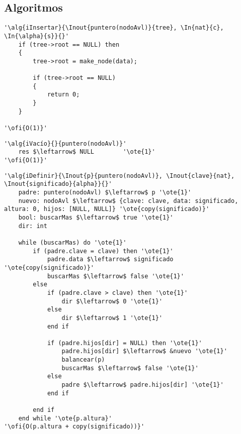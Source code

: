 


\subsection{Algoritmos}

\lstset{style=alg,columns=fixed,basewidth=.5em}

\begin{lstlisting}[mathescape]
'\alg{iInsertar}{\Inout{puntero(nodoAvl)}{tree}, \In{nat}{c}, \In{\alpha}{s}}{}'
    if (tree->root == NULL) then
    {
        tree->root = make_node(data);

        if (tree->root == NULL)
        {
            return 0;
        }
    }
 
'\ofi{O(1)}'
\end{lstlisting}


\lstset{style=alg,columns=fixed,basewidth=.5em}

\begin{lstlisting}[mathescape]
'\alg{iVacío}{}{puntero(nodoAvl)}'
	res $\leftarrow$ NULL		 '\ote{1}'
'\ofi{O(1)}'
\end{lstlisting}

\begin{lstlisting}[mathescape]
'\alg{iDefinir}{\Inout{p}{puntero(nodoAvl)}, \Inout{clave}{nat}, \Inout{significado}{alpha}}{}'
	padre: puntero(nodoAvl) $\leftarrow$ p '\ote{1}'
	nuevo: nodoAvl $\leftarrow$ {clave: clave, data: significado, altura: 0, hijos: [NULL, NULL]} '\ote{copy(significado)}'
	bool: buscarMas $\leftarrow$ true '\ote{1}'
	dir: int

	while (buscarMas) do '\ote{1}'
		if (padre.clave = clave) then '\ote{1}'
			padre.data $\leftarrow$ significado '\ote{copy(significado)}'
			buscarMas $\leftarrow$ false '\ote{1}'
		else
			if (padre.clave > clave) then '\ote{1}'
				dir $\leftarrow$ 0 '\ote{1}'
			else
				dir $\leftarrow$ 1 '\ote{1}'
			end if

		    if (padre.hijos[dir] = NULL) then '\ote{1}'
				padre.hijos[dir] $\leftarrow$ &nuevo '\ote{1}'
				balancear(p)
				buscarMas $\leftarrow$ false '\ote{1}'
			else
				padre $\leftarrow$ padre.hijos[dir] '\ote{1}'
			end if

		end if
	end while '\ote{p.altura}'
'\ofi{O(p.altura + copy(significado))}'
\end{lstlisting}

